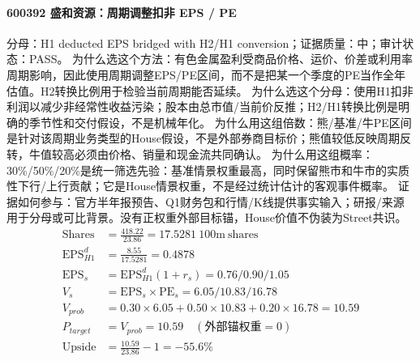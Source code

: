 \paragraph{600392 盛和资源：周期调整扣非 EPS / PE}
分母：H1 deducted EPS bridged with H2/H1 conversion；证据质量：中；审计状态：PASS。
为什么选这个方法：有色金属盈利受商品价格、运价、价差或利用率周期影响，因此使用周期调整EPS/PE区间，而不是把某一个季度的PE当作全年估值。H2转换比例用于检验当前周期能否延续。
为什么选这个分母：使用H1扣非利润以减少非经常性收益污染；股本由总市值/当前价反推；H2/H1转换比例是明确的季节性和交付假设，不是机械年化。
为什么用这组倍数：熊/基准/牛PE区间是针对该周期业务类型的House假设，不是外部券商目标价；熊值较低反映周期反转，牛值较高必须由价格、销量和现金流共同确认。
为什么用这组概率：30\%/50\%/20\%是统一筛选先验：基准情景权重最高，同时保留熊市和牛市的实质性下行/上行贡献；它是House情景权重，不是经过统计估计的客观事件概率。
证据如何参与：官方半年报预告、Q1财务包和行情/K线提供事实输入；研报/来源用于分母或可比背景。没有正权重外部目标锚，House价值不伪装为Street共识。
\begin{align*}
\mathrm{Shares} &= \frac{418.22}{23.86}=17.5281\ \mathrm{100m\ shares}\\
\mathrm{EPS}_{H1}^d &= \frac{8.55}{17.5281}=0.4878\\
\mathrm{EPS}_s &= \mathrm{EPS}_{H1}^d(1+r_s)=0.76/0.90/1.05\\
V_s &= \mathrm{EPS}_s\times \mathrm{PE}_s=6.05/10.83/16.78\\
V_{prob} &= 0.30\times 6.05+0.50\times 10.83+0.20\times 16.78=10.59\\
P_{target} &= V_{prob}=10.59\quad(\text{外部锚权重}=0)\\
\mathrm{Upside} &= \frac{10.59}{23.86}-1=-55.6\%\\
\end{align*}

